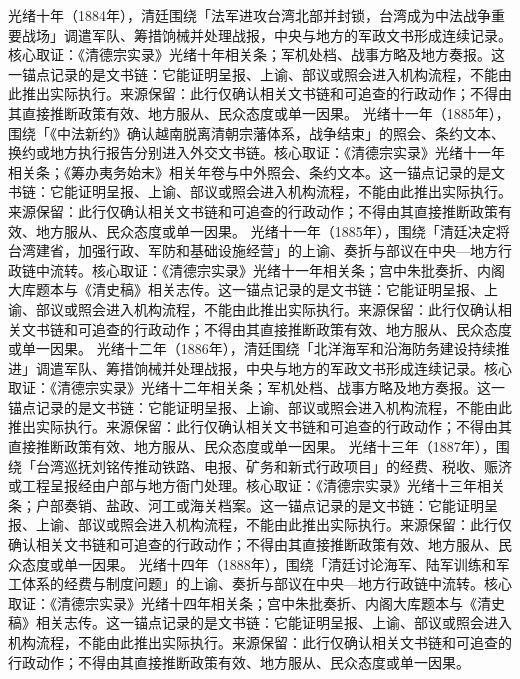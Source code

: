 光绪十年（1884年），清廷围绕「法军进攻台湾北部并封锁，台湾成为中法战争重要战场」调遣军队、筹措饷械并处理战报，中央与地方的军政文书形成连续记录。核心取证：《清德宗实录》光绪十年相关条；军机处档、战事方略及地方奏报。这一锚点记录的是文书链：它能证明呈报、上谕、部议或照会进入机构流程，不能由此推出实际执行。来源保留：此行仅确认相关文书链和可追查的行政动作；不得由其直接推断政策有效、地方服从、民众态度或单一因果。
光绪十一年（1885年），围绕「《中法新约》确认越南脱离清朝宗藩体系，战争结束」的照会、条约文本、换约或地方执行报告分别进入外交文书链。核心取证：《清德宗实录》光绪十一年相关条；《筹办夷务始末》相关年卷与中外照会、条约文本。这一锚点记录的是文书链：它能证明呈报、上谕、部议或照会进入机构流程，不能由此推出实际执行。来源保留：此行仅确认相关文书链和可追查的行政动作；不得由其直接推断政策有效、地方服从、民众态度或单一因果。
光绪十一年（1885年），围绕「清廷决定将台湾建省，加强行政、军防和基础设施经营」的上谕、奏折与部议在中央—地方行政链中流转。核心取证：《清德宗实录》光绪十一年相关条；宫中朱批奏折、内阁大库题本与《清史稿》相关志传。这一锚点记录的是文书链：它能证明呈报、上谕、部议或照会进入机构流程，不能由此推出实际执行。来源保留：此行仅确认相关文书链和可追查的行政动作；不得由其直接推断政策有效、地方服从、民众态度或单一因果。
光绪十二年（1886年），清廷围绕「北洋海军和沿海防务建设持续推进」调遣军队、筹措饷械并处理战报，中央与地方的军政文书形成连续记录。核心取证：《清德宗实录》光绪十二年相关条；军机处档、战事方略及地方奏报。这一锚点记录的是文书链：它能证明呈报、上谕、部议或照会进入机构流程，不能由此推出实际执行。来源保留：此行仅确认相关文书链和可追查的行政动作；不得由其直接推断政策有效、地方服从、民众态度或单一因果。
光绪十三年（1887年），围绕「台湾巡抚刘铭传推动铁路、电报、矿务和新式行政项目」的经费、税收、赈济或工程呈报经由户部与地方衙门处理。核心取证：《清德宗实录》光绪十三年相关条；户部奏销、盐政、河工或海关档案。这一锚点记录的是文书链：它能证明呈报、上谕、部议或照会进入机构流程，不能由此推出实际执行。来源保留：此行仅确认相关文书链和可追查的行政动作；不得由其直接推断政策有效、地方服从、民众态度或单一因果。
光绪十四年（1888年），围绕「清廷讨论海军、陆军训练和军工体系的经费与制度问题」的上谕、奏折与部议在中央—地方行政链中流转。核心取证：《清德宗实录》光绪十四年相关条；宫中朱批奏折、内阁大库题本与《清史稿》相关志传。这一锚点记录的是文书链：它能证明呈报、上谕、部议或照会进入机构流程，不能由此推出实际执行。来源保留：此行仅确认相关文书链和可追查的行政动作；不得由其直接推断政策有效、地方服从、民众态度或单一因果。
